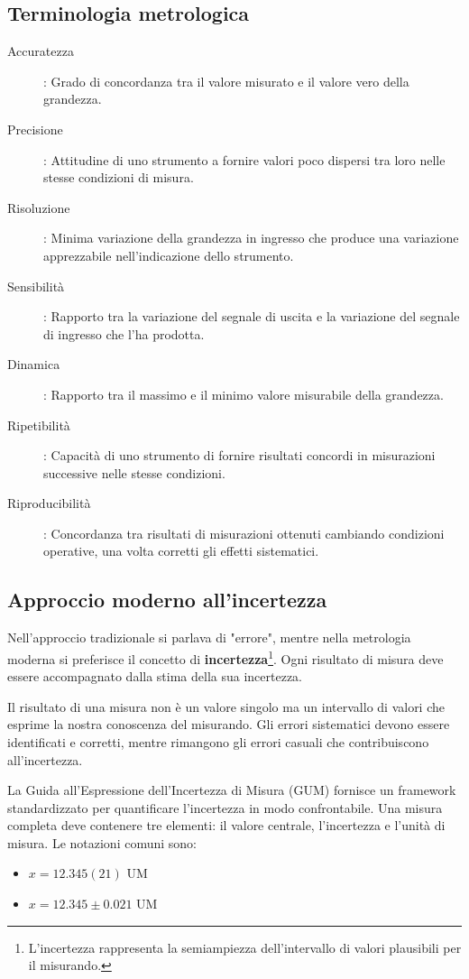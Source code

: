 \subsection{Terminologia metrologica}
\begin{description}
    \item[Accuratezza]: Grado di concordanza tra il valore misurato e il valore vero della grandezza.
    \item[Precisione]: Attitudine di uno strumento a fornire valori poco dispersi tra loro nelle stesse condizioni di misura.
    \item[Risoluzione]: Minima variazione della grandezza in ingresso che produce una variazione apprezzabile nell'indicazione dello strumento.
    \item[Sensibilità]: Rapporto tra la variazione del segnale di uscita e la variazione del segnale di ingresso che l'ha prodotta.
    \item[Dinamica]: Rapporto tra il massimo e il minimo valore misurabile della grandezza.
    \item[Ripetibilità]: Capacità di uno strumento di fornire risultati concordi in misurazioni successive nelle stesse condizioni.
    \item[Riproducibilità]: Concordanza tra risultati di misurazioni ottenuti cambiando condizioni operative, una volta corretti gli effetti sistematici.
\end{description}

\subsection{Approccio moderno all'incertezza}
Nell'approccio tradizionale si parlava di "errore", mentre nella metrologia moderna si preferisce il concetto di \textbf{incertezza}\footnote{L'incertezza rappresenta la semiampiezza dell'intervallo di valori plausibili per il misurando.}. Ogni risultato di misura deve essere accompagnato dalla stima della sua incertezza.

Il risultato di una misura non è un valore singolo ma un intervallo di valori che esprime la nostra conoscenza del misurando. Gli errori sistematici devono essere identificati e corretti, mentre rimangono gli errori casuali che contribuiscono all'incertezza.

La Guida all'Espressione dell'Incertezza di Misura (GUM) fornisce un framework standardizzato per quantificare l'incertezza in modo confrontabile. Una misura completa deve contenere tre elementi: il valore centrale, l'incertezza e l'unità di misura. Le notazioni comuni sono:
\begin{itemize}
    \item $x = 12.345(21)$ UM
    \item $x = 12.345 \pm 0.021$ UM
\end{itemize}


